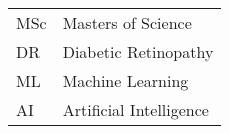 
\starttables{}%
\tableofcontents{}\clearpage%
\listoffigures{}\clearpage%
\listoftables{}\clearpage%


\listoffixmes{}

\begin{tabular}{ll}
MSc &Masters of Science\\
DR & Diabetic Retinopathy\\
ML & Machine Learning\\
AI & Artificial Intelligence\\
\end{tabular}

